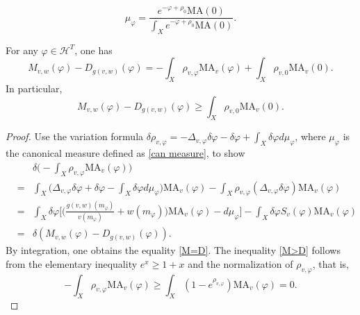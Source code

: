 \documentclass[10pt,a4paper]{amsart}
\newcommand{\MA}{\mathrm{MA}}
\renewcommand{\geq}{\geqslant}
\renewcommand{\phi}{\varphi}
\begin{document}
\begin{equation}\label{can measure}
\mu_{\phi}=
\frac{e^{-\phi+\rho_{0}}\MA(0)}{\int_{X}e^{-\phi+\rho_{0}}\MA(0)}.
\end{equation}

\begin{proposition}\label{comparison}
For any $\phi\in\mathcal{H}^{T}$, one has
\begin{equation}\label{M=D}
M_{v,w}(\phi)-D_{g(v,w)}(\phi)
=-\int_{X}\rho_{v,\phi}\MA_{v}(\phi)+\int_{X}\rho_{v,0}\MA_{v}(0).
\end{equation}
In particular, 
\begin{equation}\label{M>D}
M_{v,w}(\phi)-D_{g(v,w)}(\phi)\geq \int_{X}\rho_{v,0}\MA_{v}(0).
\end{equation}
\end{proposition}

\begin{proof}
Use the variation formula
$\delta\rho_{v,\phi}=-\Delta_{v,\phi}\delta\phi-\delta\phi+\int_{X}\delta\phi d\mu_{\phi}$,
where $\mu_{\phi}$ is the canonical measure defined as \eqref{can measure},
to show
\begin{eqnarray*}
&&\delta\Big(-\int_{X}\rho_{v,\phi}\MA_{v}(\phi)\Big)\\
&=&\int_{X}\Big(\Delta_{v,\phi}\delta\phi+\delta\phi-\int_{X}\delta\phi d\mu_{\phi}\Big)
\MA_{v}(\phi)
-\int_{X}\rho_{v,\phi}(\Delta_{v,\phi}\delta\phi)\MA_{v}(\phi) \\
&=&\int_{X}\delta\phi\Big[\Big(\frac{g(v,w)(m_{\phi})}{v(m_{\phi})}
+w(m_{\phi})\Big)\MA_{v}(\phi)-d\mu_{\phi}\Big]
-\int_{X}\delta\phi S_{v}(\phi)\MA_{v}(\phi) \\
&=& \delta\left( M_{v,w}(\phi)-D_{g(v,w)}(\phi) \right).
\end{eqnarray*}
By integration, one obtains the equality \eqref{M=D}.
The inequality \eqref{M>D} follows from
the elementary inequality $e^{x}\geq 1+x$ and the normalization of $\rho_{v,\phi}$,
that is,
\begin{equation}
-\int_{X}\rho_{v,\phi}\MA_{v}(\phi)\geq\int_{X}(1-e^{\rho_{v,\phi}})\MA_{v}(\phi)=0.
\end{equation}
\end{proof}
\end{document}
